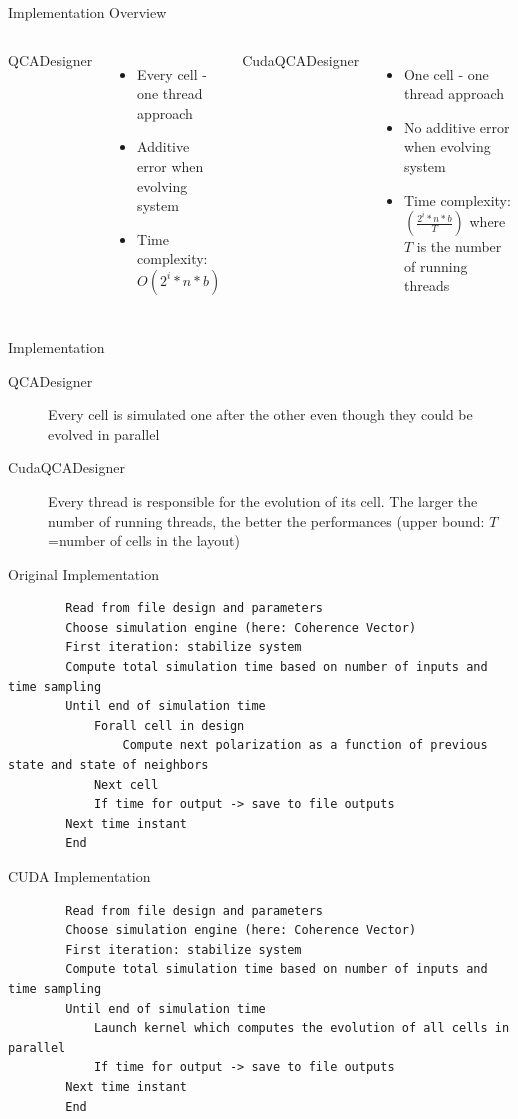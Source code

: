 \documentclass[10pt, red]{beamer}
\begin{document}
	\begin{frame}{Implementation Overview}
		\begin{columns}
			QCADesigner
			\begin{itemize}
				\item Every cell - one thread approach
				\item Additive error when evolving system
				\item Time complexity: $O(2^i*n*b)$
			\end{itemize}
			CudaQCADesigner
			\begin{itemize}
				\item One cell - one thread approach
				\item No additive error when evolving system
				\item Time complexity: $(\frac{2^i*n*b}{T})$ where $T$ is the number of running threads
			\end{itemize}
		\end{columns}
	\end{frame}

	\begin{frame}{Implementation}
		\begin{description}
			\item[QCADesigner] Every cell is simulated one after the other even though they could be evolved in parallel
			\item[CudaQCADesigner] Every thread is responsible for the evolution of its cell. The larger the number of running threads, the better the performances (upper bound: $T$=number of cells in the layout)
		\end{description}
	\end{frame}

	\begin{frame}{Original Implementation}
		\begin{verbatim}
		Read from file design and parameters
		Choose simulation engine (here: Coherence Vector)
		First iteration: stabilize system
		Compute total simulation time based on number of inputs and time sampling
		Until end of simulation time
			Forall cell in design
				Compute next polarization as a function of previous state and state of neighbors
			Next cell
			If time for output -> save to file outputs
		Next time instant
		End
		\end{verbatim}
	\end{frame}
	
		\begin{frame}{CUDA Implementation}
		\begin{verbatim}
		Read from file design and parameters
		Choose simulation engine (here: Coherence Vector)
		First iteration: stabilize system
		Compute total simulation time based on number of inputs and time sampling
		Until end of simulation time
			Launch kernel which computes the evolution of all cells in parallel
			If time for output -> save to file outputs
		Next time instant
		End
		\end{verbatim}
	\end{frame}
\end{document}
